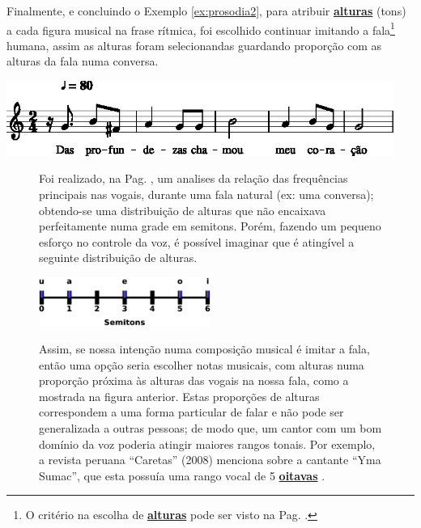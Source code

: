 \begin{example}
\label{ex:prosodia3}
Finalmente, e concluindo o Exemplo \ref{ex:prosodia2}, 
para atribuir \hyperref[sec:pos:Altura]{\textbf{alturas}} (tons) a cada figura musical na frase rítmica, 
foi escolhido continuar imitando a fala\footnote{O 
critério na escolha de \hyperref[sec:pos:Altura]{\textbf{alturas}} pode ser visto na Pag. \pageref{ref:minhasvogais}.}
humana,
assim as alturas foram selecionandas guardando proporção com as alturas da fala numa conversa.
\begin{center}
\includegraphics[width=0.95\textwidth]{chapters/cap-musica-topicos/frase5-1.eps}
\end{center}
\end{example}

\begin{figure}[!ht]
\begin{elaboracion}[title=Minhas vogais]
Foi realizado, na Pag. \pageref{fig:timbresvocais}, um analises da relação das frequências principais nas vogais,
durante uma fala natural (ex: uma conversa);
obtendo-se uma distribuição de alturas que não encaixava perfeitamente numa grade em semitons.
Porém, fazendo um pequeno esforço no controle da voz, 
é possível imaginar que é atingível a seguinte distribuição de alturas.
\begin{center}
\includegraphics[width=0.50\textwidth]{chapters/cap-musica-topicos/vocales-semitons2.eps}
\end{center}
Assim, se nossa intenção numa composição musical é imitar a fala, 
então uma opção seria escolher notas musicais, 
com alturas numa proporção próxima às alturas das vogais na nossa fala, 
como a mostrada na figura anterior.
Estas proporções de alturas correspondem a uma forma particular de falar e não pode ser generalizada a outras pessoas;
de modo que, um cantor com um bom domínio da voz poderia atingir maiores rangos tonais.
Por exemplo, a revista peruana ``Caretas'' (2008)  menciona sobre a cantante ``Yma Sumac'',
que esta possuía uma rango vocal de 5 \hyperref[sec:pos:Oitava]{\textbf{oitavas}} \cite[pp. 73]{2008caretas}.  
\end{elaboracion}
\label{ref:minhasvogais}
\end{figure}






